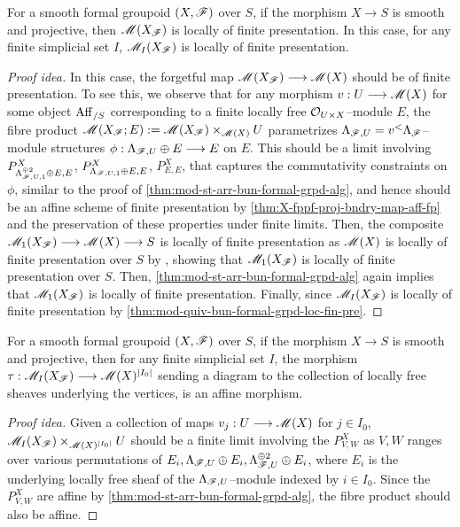 \documentclass[11pt]{amsart}
\begin{document}
\begin{cnj}\label{cnj:mod-Lambda-mod-loc-fp}
For a smooth formal groupoid $(X, \mathscr{F})$ over $S$, if the morphism
$X \to S$ is smooth and projective, then $\mathscr{M}(X_\mathscr{F})$ is locally of finite
presentation. In this case, for any finite simplicial set $I$, $\mathscr{M}_I(X_\mathscr{F})$
is locally of finite presentation.
\end{cnj}
\begin{proof}[Proof idea]
In this case, the forgetful map $\sM(X_\sF) \to \sM(X)$ should be of finite
presentation. To see this, we observe that for any morphism
$v : U \to \sM(X)$ for some object $\mathrm{Aff}_{/S}$ corresponding to a finite locally
free $\mathcal{O}_{U \times X}$--module $E$,
the fibre product $\mathscr{M}(X_\mathscr{F}; E) := \mathscr{M}(X_\mathscr{F}) \times_{\mathscr{M}(X)} U$
parametrizes $\Lambda_{\mathscr{F}, U} = v^<\Lambda_{\mathscr{F}}$--module structures
$\phi : \Lambda_{\sF, U} \oplus E \to E$ on $E$.
This should be a limit involving
$P^X_{\Lambda_{\mathscr{F}, U, 1}^{\oplus 2} \oplus E, E}$,
$P^X_{\Lambda_{\mathscr{F}, U, 1} \oplus E, E}$,
$P^X_{E, E}$, that captures the commutativity constraints on $\phi$, similar
to the proof of \cref{thm:mod-st-arr-bun-formal-grpd-alg}, and hence should
be an affine scheme of finite presentation by
\cref{thm:X-fppf-proj-bndry-map-aff-fp} and the preservation of these properties
under finite limits.
Then, the composite $\sM_1(X_\sF) \to \sM(X) \to S$ is locally of finite
presentation as $\mathscr{M}(X)$ is locally of finite presentation over $S$
by \cite[Theorem 1.0.1]{Wang-BunG}, showing that $\mathscr{M}_1(X_\mathscr{F})$ is locally
of finite presentation over $S$.
Then, \cref{thm:mod-st-arr-bun-formal-grpd-alg}
again implies that $\mathscr{M}_1(X_\mathscr{F})$ is locally of finite presentation.
Finally, since $\mathscr{M}_I(X_\mathscr{F})$ is locally of finite presentation by
\cref{thm:mod-quiv-bun-formal-grpd-loc-fin-pre}.
\end{proof}

\begin{cnj}\label{cnj:affine-truncation}
For a smooth formal groupoid $(X, \mathscr{F})$ over $S$, if the morphism
$X \to S$ is smooth and projective, then for any finite simplicial set
$I$, the morphism $\tau : \sM_I(X_\sF) \to \sM(X)^{|I_0|}$ sending a diagram
to the collection of locally free sheaves underlying the vertices, is an affine
morphism.
\end{cnj}
\begin{proof}[Proof idea]
Given a collection of maps $v_j : U \to \sM(X)$ for $j \in I_0$,
$\mathscr{M}_I(X_\mathscr{F}) \times_{\mathscr{M}(X)^{|I_0|}} U$ should be
a finite limit involving the $P^X_{V, W}$ as $V, W$ ranges over various
permutations of
$E_i, \Lambda_{\mathscr{F}, U} \oplus E_i, \Lambda_{\mathscr{F}, U}^{\oplus 2} \oplus E_i$,
where $E_i$ is the underlying locally free sheaf of the
$\Lambda_{\mathscr{F}, U}$--module indexed by $i \in I_0$. Since the $P^X_{V, W}$
are affine by \cref{thm:mod-st-arr-bun-formal-grpd-alg}, the fibre product
should also be affine.
\end{proof}
\end{document}
